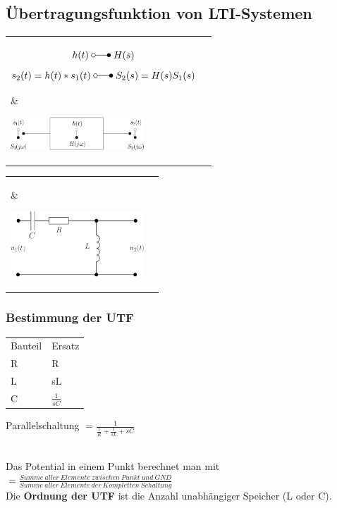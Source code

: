 	\subsection{Übertragungsfunktion von LTI-Systemen }
		\begin{tabular}{ll}
			\parbox{13cm}{
				$$h(t) \; \laplace \; H(s)$$
				$$s_2(t) = h(t) * s_1(t) \; \laplace \; S_2(s) = H(s) S_1(s)$$}
		& 	\parbox{5cm}{
				\includegraphics[width=5cm]{./bilder/utf-theorie.png}}
		\\
		\\
		\end{tabular}
		
		\begin{tabular}{ll}
			\parbox{13cm}{ }
		& 	\parbox{5cm}{
				\includegraphics[width=5cm]{./bilder/utf-beispiel.png}}
		\\	
		\end{tabular}
		
		\subsubsection{Bestimmung der UTF}
		\parbox{10cm}{
			\begin{tabular}{ll}
				Bauteil & Ersatz \\
				R & R\\
				L & sL\\
				C & $\frac{1}{sC}$ \\
			\end{tabular}
			Parallelschaltung $= \frac{1}{\frac{1}{R}+\frac{1}{sL}+sC}$\\ \\
		}
		\parbox{8cm}{
			
			Das Potential in einem Punkt berechnet man mit $=\frac{Summe\ aller\
			Elemente\ zwischen\ Punkt\ und\ GND}{Summe\ aller\ Elemente\ der\ Kompletten\ Schaltung}$\\
			Die \textbf{Ordnung der UTF} ist die Anzahl unabhängiger Speicher (L oder C).}		
		
